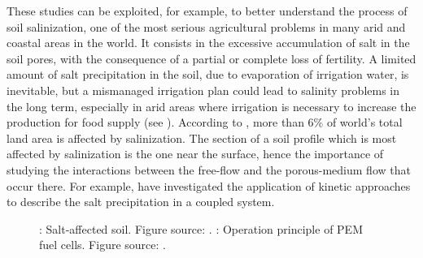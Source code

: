 These studies can be exploited, for example, to better understand the process 
of soil salinization, one of the most serious agricultural problems in 
many arid and coastal areas in the world. It consists in the excessive 
accumulation of salt in the soil pores, with the consequence of a partial or 
complete loss of fertility. A limited amount of salt precipitation in the soil, 
due to evaporation of irrigation water, is inevitable, but a mismanaged irrigation plan could lead to salinity problems in the long term, especially in arid 
areas where irrigation is necessary to increase the production for food supply 
(see \cite{web:fao}). According to \cite{soil:munns}, more than 6\% of world's 
total land area is affected by salinization.
The section of a soil profile which is most affected by salinization is the one near the surface, hence the importance of studying the interactions between the free-flow and the porous-medium flow that occur there.
For example, \textcite{intro:salinization} have investigated the application of kinetic 
approaches to describe the salt precipitation in a coupled system.
\begin{figure}
	\centering
	\caption[Salt-affected soil and operation principle of PEM fuel 
	cells]{\protect{}: Salt-affected soil. Figure source: 
	\cite{web:fao}. \protect{}: Operation principle of PEM fuel 
	cells. Figure source: \cite{intro:pemfig}.}
	\label{fig:intro2}
\end{figure}

